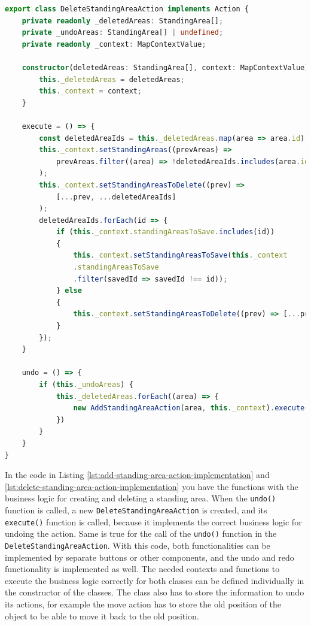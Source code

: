 \begin{lstlisting}[language=TypeScript,caption={Delete Standing Area Action Implementation},label={lst:delete-standing-area-action-implementation}]
export class DeleteStandingAreaAction implements Action {
    private readonly _deletedAreas: StandingArea[];
    private _undoAreas: StandingArea[] | undefined;
    private readonly _context: MapContextValue;

    constructor(deletedAreas: StandingArea[], context: MapContextValue) {
        this._deletedAreas = deletedAreas;
        this._context = context;
    }

    execute = () => {
        const deletedAreaIds = this._deletedAreas.map(area => area.id);
        this._context.setStandingAreas((prevAreas) =>
            prevAreas.filter((area) => !deletedAreaIds.includes(area.id))
        );
        this._context.setStandingAreasToDelete((prev) => 
            [...prev, ...deletedAreaIds]
        );
        deletedAreaIds.forEach(id => {
            if (this._context.standingAreasToSave.includes(id)) 
            {
                this._context.setStandingAreasToSave(this._context
                .standingAreasToSave
                .filter(savedId => savedId !== id));
            } else 
            {
                this._context.setStandingAreasToDelete((prev) => [...prev, id]);
            }
        });
    }

    undo = () => {
        if (this._undoAreas) {
            this._deletedAreas.forEach((area) => {
                new AddStandingAreaAction(area, this._context).execute()
            })
        }
    }
}
\end{lstlisting}

In the code in Listing \ref{lst:add-standing-area-action-implementation} and \ref{lst:delete-standing-area-action-implementation} you have the functions with the business logic for creating and deleting a standing area. When the \texttt{undo()} function is called, a new \texttt{DeleteStandingAreaAction} is created, and its \texttt{execute()} function is called, because it implements the correct business logic for undoing the action. Same is true for the call of the \texttt{undo()} function in the \texttt{DeleteStandingAreaAction}. With this code, both functionalities can be implemented by separate buttons or other components, and the undo and redo functionality is implemented as well. The needed contexts and functions to execute the business logic correctly for both classes can be defined individually in the constructor of the classes. The class also has to store the information to undo its actions, for example the move action has to store the old position of the object to be able to move it back to the old position.

